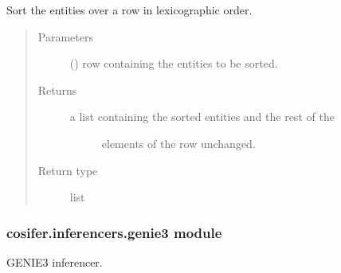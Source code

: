 \documentclass[letterpaper,10pt,english]{sphinxmanual}
\begin{document}
\begin{fulllineitems}
\label{\detokenize{_modules/cosifer.inferencers:cosifer.inferencers.funchisq.sort_interaction_entities}}
Sort the entities over a row in lexicographic order.
\begin{quote}\begin{description}
\item[{Parameters}] \leavevmode
{} () \textendash{} row containing the entities to be sorted.

\item[{Returns}] \leavevmode
\begin{description}
\item[{a list containing the sorted entities and the rest of the}] \leavevmode
elements of the row unchanged.

\end{description}


\item[{Return type}] \leavevmode
list

\end{description}\end{quote}

\end{fulllineitems}



\subsubsection{cosifer.inferencers.genie3 module}
\label{\detokenize{_modules/cosifer.inferencers:module-cosifer.inferencers.genie3}}\label{\detokenize{_modules/cosifer.inferencers:cosifer-inferencers-genie3-module}}
GENIE3 inferencer.
\end{document}

